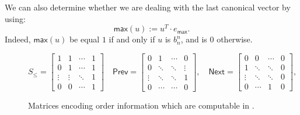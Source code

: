 We can also determine whether we are dealing with the last canonical vector by using:
$$
\mathsf{max}(u):=u^T\cdot e_{\mathsf{max}}.
$$
Indeed, $\mathsf{max}(u)$ be equal $1$ if and only if $u$ is $b_n^n$, and is $0$ otherwise.

\begin{figure}
	\[
	S_{\leq} = \begin{bmatrix}
		1 & 1 & \cdots &  1 \\
		0 & 1 & \cdots & 1\\
		\vdots & \vdots & \ddots & 1 \\
		0 & 0 & \cdots & 1 
	\end{bmatrix} \quad\mathsf{Prev} = \begin{bmatrix}
		0 & 1 & \cdots &  0 \\
		0 & \ddots & \ddots & \vdots \\
		\vdots & \ddots & \ddots& 1 \\
		0 & \cdots & \cdots & 0
	\end{bmatrix},
	\quad \mathsf{Next} = \begin{bmatrix}
		0 & 0 & \cdots &  0 \\
		1 & \ddots & \ddots & 0\\
		\vdots & \ddots & \ddots &0 \\
		0 & \cdots & 1 & 0
	\end{bmatrix},
	\] 
	\caption{Matrices encoding order information which are computable in \langfor.}\label{fig:ordermat}
\end{figure}

